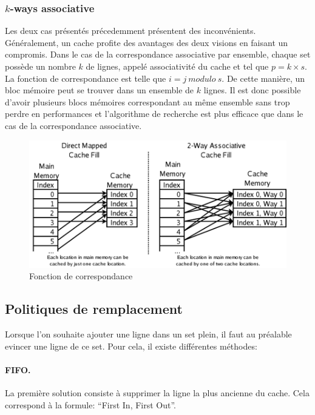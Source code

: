 \documentclass[a4paper]{article}
\begin{document}
\subsubsection{$k$-ways associative}
\indent Les deux cas présentés précedemment présentent des inconvénients. Généralement, un cache profite des avantages des deux visions en faisant un compromis. Dans le cas de la correspondance associative par ensemble, chaque set possède un nombre $k$ de lignes, appelé associativité du cache et tel que $p=k \times s$. La fonction de correspondance est telle que $i = j\ modulo\ s$. De cette manière, un bloc mémoire peut se trouver dans un ensemble de $k$ lignes. Il est donc possible d'avoir plusieurs blocs mémoires correspondant au même ensemble sans trop perdre en performances et l'algorithme de recherche est plus efficace que dans le cas de la correspondance associative.

\begin{figure}[!h]
\begin{center}
   \includegraphics[scale=0.60]{associative.png}
   \caption{\label{associative} Fonction de correspondance}
\end{center}
\end{figure}

\subsection{Politiques de remplacement}
\indent Lorsque l'on souhaite ajouter une ligne dans un set plein, il faut au préalable evincer une ligne de ce set. Pour cela, il existe différentes méthodes:

\paragraph{FIFO.} La première solution consiste à supprimer la ligne la plus ancienne du cache. Cela correspond à la formule: ``First In, First Out''.
\end{document}
